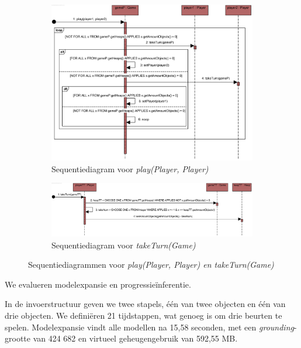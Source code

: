 \begin{figure}
	\centering
	\begin{subfigure}{\textwidth}
		\includegraphics[width=\textwidth]{chap-declaratieve-seq/play.png}
		\caption{Sequentiediagram voor \textit{play(Player, Player)}}
		\label{fig:nim-assoc-play}
	\end{subfigure}
	\begin{subfigure}{\textwidth}
		\includegraphics[width=1.1\textwidth]{chap-declaratieve-seq/takeTurn.png}
		\caption{Sequentiediagram voor \textit{takeTurn(Game)}}
		\label{fig:nim-assoc-taketurn}
	\end{subfigure}
	\caption{Sequentiediagrammen voor \textit{play(Player, Player) en \textit{takeTurn(Game)}}}
	\label{fig:nim-assoc-seq}
\end{figure}

We evalueren modelexpansie en progressie\"inferentie.

In de invoerstructuur geven we twee stapels, \'e\'en van twee objecten en \'e\'en van drie objecten. We defini\"eren 21 tijdstappen, wat genoeg is om drie beurten te spelen. Modelexpansie vindt alle modellen na 15,58 seconden, met een \textit{grounding}-grootte van 424 682 en virtueel geheugengebruik van 592,55 MB.

